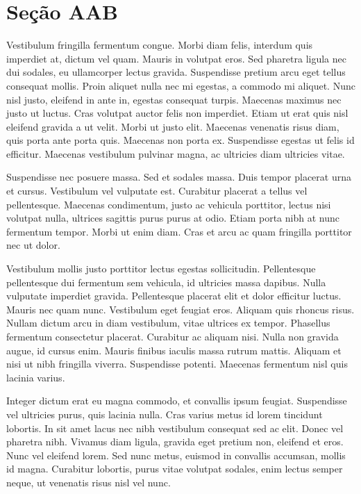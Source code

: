 \documentclass{article}
\begin{document}
	\section{Seção AAB}
	
	Vestibulum fringilla fermentum congue. Morbi diam felis, interdum quis imperdiet at, dictum vel quam. Mauris in volutpat eros. Sed pharetra ligula nec dui sodales, eu ullamcorper lectus gravida. Suspendisse pretium arcu eget tellus consequat mollis. Proin aliquet nulla nec mi egestas, a commodo mi aliquet. Nunc nisl justo, eleifend in ante in, egestas consequat turpis. Maecenas maximus nec justo ut luctus. Cras volutpat auctor felis non imperdiet. Etiam ut erat quis nisl eleifend gravida a ut velit. Morbi ut justo elit. Maecenas venenatis risus diam, quis porta ante porta quis. Maecenas non porta ex. Suspendisse egestas ut felis id efficitur. Maecenas vestibulum pulvinar magna, ac ultricies diam ultricies vitae.
	
	Suspendisse nec posuere massa. Sed et sodales massa. Duis tempor placerat urna et cursus. Vestibulum vel vulputate est. Curabitur placerat a tellus vel pellentesque. Maecenas condimentum, justo ac vehicula porttitor, lectus nisi volutpat nulla, ultrices sagittis purus purus at odio. Etiam porta nibh at nunc fermentum tempor. Morbi ut enim diam. Cras et arcu ac quam fringilla porttitor nec ut dolor.
	
	Vestibulum mollis justo porttitor lectus egestas sollicitudin. Pellentesque pellentesque dui fermentum sem vehicula, id ultricies massa dapibus. Nulla vulputate imperdiet gravida. Pellentesque placerat elit et dolor efficitur luctus. Mauris nec quam nunc. Vestibulum eget feugiat eros. Aliquam quis rhoncus risus. Nullam dictum arcu in diam vestibulum, vitae ultrices ex tempor. Phasellus fermentum consectetur placerat. Curabitur ac aliquam nisi. Nulla non gravida augue, id cursus enim. Mauris finibus iaculis massa rutrum mattis. Aliquam et nisi ut nibh fringilla viverra. Suspendisse potenti. Maecenas fermentum nisl quis lacinia varius.
	
	Integer dictum erat eu magna commodo, et convallis ipsum feugiat. Suspendisse vel ultricies purus, quis lacinia nulla. Cras varius metus id lorem tincidunt lobortis. In sit amet lacus nec nibh vestibulum consequat sed ac elit. Donec vel pharetra nibh. Vivamus diam ligula, gravida eget pretium non, eleifend et eros. Nunc vel eleifend lorem. Sed nunc metus, euismod in convallis accumsan, mollis id magna. Curabitur lobortis, purus vitae volutpat sodales, enim lectus semper neque, ut venenatis risus nisl vel nunc.
	
\end{document}
